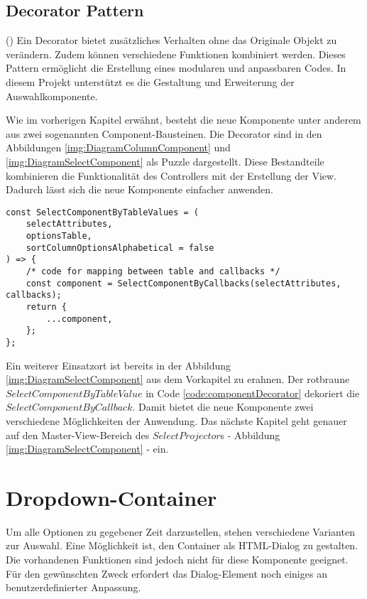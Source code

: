 \subsection{Decorator Pattern}
\label{sec:decoratorPattern}

(\cite{decoratorPattern}) Ein Decorator bietet zusätzliches Verhalten ohne das Originale Objekt zu verändern.
Zudem können verschiedene Funktionen kombiniert werden.
Dieses Pattern ermöglicht die Erstellung eines modularen und anpassbaren Codes.
In diesem Projekt unterstützt es die Gestaltung und Erweiterung der Auswahlkomponente.

Wie im vorherigen Kapitel erwähnt, besteht die neue Komponente unter anderem aus zwei sogenannten Component-Bausteinen.
Die Decorator sind in den Abbildungen \ref{img:DiagramColumnComponent} und \ref{img:DiagramSelectComponent} als Puzzle dargestellt.
Diese Bestandteile kombinieren die Funktionalität des Controllers mit der Erstellung der View.
Dadurch lässt sich die neue Komponente einfacher anwenden.

\begin{lstlisting}[style = htmlcssjs, caption = SelectComponentByTableValue dekoriert SelectComponentByCallback, label = code:componentDecorator]
const SelectComponentByTableValues = (
    selectAttributes,
    optionsTable,
    sortColumnOptionsAlphabetical = false
) => {
    /* code for mapping between table and callbacks */
    const component = SelectComponentByCallbacks(selectAttributes, callbacks);
    return {
        ...component,
    };
};
\end{lstlisting}

Ein weiterer Einsatzort ist bereits in der Abbildung \ref{img:DiagramSelectComponent} aus dem Vorkapitel zu erahnen.
Der rotbraune $SelectComponentByTableValue$ in Code \ref{code:componentDecorator} dekoriert die $SelectComponentByCallback$.
Damit bietet die neue Komponente zwei verschiedene Möglichkeiten der Anwendung.
Das nächste Kapitel geht genauer auf den Master-View-Bereich des $SelectProjector$s - Abbildung \ref{img:DiagramSelectComponent} - ein.


\section{Dropdown-Container}
\label{sec:dropdownContainer}

Um alle Optionen zu gegebener Zeit darzustellen, stehen verschiedene Varianten zur Auswahl.
Eine Möglichkeit ist, den Container als HTML-Dialog zu gestalten.
Die vorhandenen Funktionen sind jedoch nicht für diese Komponente geeignet.
Für den gewünschten Zweck erfordert das Dialog-Element noch einiges an benutzerdefinierter Anpassung.

